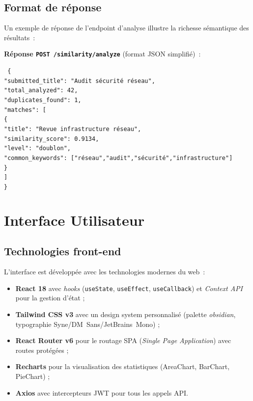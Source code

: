 \documentclass[12pt, a4paper]{article}
\begin{document}
\subsection{Format de réponse}

Un exemple de réponse de l'endpoint d'analyse illustre la richesse sémantique des résultats~:

\begin{infobox}
\small
\textbf{Réponse \texttt{POST /similarity/analyze}} (format JSON simplifié)~:

\medskip
\texttt{
\{\\
\quad "submitted\_title": "Audit sécurité réseau",\\
\quad "total\_analyzed": 42,\\
\quad "duplicates\_found": 1,\\
\quad "matches": [\\
\quad\quad \{\\
\quad\quad\quad "title": "Revue infrastructure réseau",\\
\quad\quad\quad "similarity\_score": 0.9134,\\
\quad\quad\quad "level": "doublon",\\
\quad\quad\quad "common\_keywords": ["réseau","audit","sécurité","infrastructure"]\\
\quad\quad \}\\
\quad ]\\
\}
}
\end{infobox}

\section{Interface Utilisateur}

\subsection{Technologies front-end}

L'interface est développée avec les technologies modernes du web~:

\begin{itemize}
  \item \textbf{React 18} avec \textit{hooks} (\texttt{useState}, \texttt{useEffect}, \texttt{useCallback}) et \textit{Context API} pour la gestion d'état ;
  \item \textbf{Tailwind CSS v3} avec un design system personnalisé (palette \textit{obsidian}, typographie Syne/DM~Sans/JetBrains~Mono) ;
  \item \textbf{React Router v6} pour le routage SPA (\textit{Single Page Application}) avec routes protégées ;
  \item \textbf{Recharts} pour la visualisation des statistiques (AreaChart, BarChart, PieChart) ;
  \item \textbf{Axios} avec intercepteurs JWT pour tous les appels API.
\end{itemize}
\end{document}
